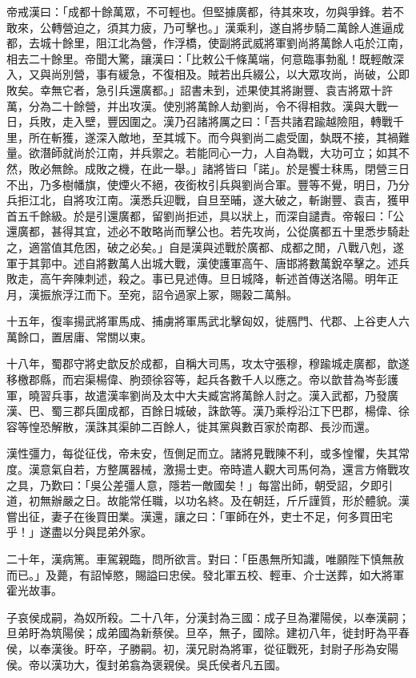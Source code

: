 \begin{pinyinscope}
帝戒漢曰：「成都十餘萬眾，不可輕也。但堅據廣都，待其來攻，勿與爭鋒。若不敢來，公轉營迫之，須其力疲，乃可擊也。」漢乘利，遂自將步騎二萬餘人進逼成都，去城十餘里，阻江北為營，作浮橋，使副將武威將軍劉尚將萬餘人屯於江南，相去二十餘里。帝聞大驚，讓漢曰：「比敕公千條萬端，何意臨事勃亂！既輕敵深入，又與尚別營，事有緩急，不復相及。賊若出兵綴公，以大眾攻尚，尚破，公即敗矣。幸無它者，急引兵還廣都。」詔書未到，述果使其將謝豐、袁吉將眾十許萬，分為二十餘營，并出攻漢。使別將萬餘人劫劉尚，令不得相救。漢與大戰一日，兵敗，走入壁，豐因圍之。漢乃召諸將厲之曰：「吾共諸君踰越險阻，轉戰千里，所在斬獲，遂深入敵地，至其城下。而今與劉尚二處受圍，埶既不接，其禍難量。欲潛師就尚於江南，并兵禦之。若能同心一力，人自為戰，大功可立；如其不然，敗必無餘。成敗之機，在此一舉。」諸將皆曰「諾」。於是饗士秣馬，閉營三日不出，乃多樹幡旗，使煙火不絕，夜銜枚引兵與劉尚合軍。豐等不覺，明日，乃分兵拒江北，自將攻江南。漢悉兵迎戰，自旦至晡，遂大破之，斬謝豐、袁吉，獲甲首五千餘級。於是引還廣都，留劉尚拒述，具以狀上，而深自譴責。帝報曰：「公還廣都，甚得其宜，述必不敢略尚而擊公也。若先攻尚，公從廣都五十里悉步騎赴之，適當值其危困，破之必矣。」自是漢與述戰於廣都、成都之閒，八戰八剋，遂軍于其郭中。述自將數萬人出城大戰，漢使護軍高午、唐邯將數萬銳卒擊之。述兵敗走，高午奔陳刺述，殺之。事已見述傳。旦日城降，斬述首傳送洛陽。明年正月，漢振旅浮江而下。至宛，詔令過家上冢，賜穀二萬斛。

十五年，復率揚武將軍馬成、捕虜將軍馬武北擊匈奴，徙鴈門、代郡、上谷吏人六萬餘口，置居庸、常關以東。

十八年，蜀郡守將史歆反於成都，自稱大司馬，攻太守張穆，穆踰城走廣都，歆遂移檄郡縣，而宕渠楊偉、朐颈徐容等，起兵各數千人以應之。帝以歆昔為岑彭護軍，曉習兵事，故遣漢率劉尚及太中大夫臧宮將萬餘人討之。漢入武都，乃發廣漢、巴、蜀三郡兵圍成都，百餘日城破，誅歆等。漢乃乘桴沿江下巴郡，楊偉、徐容等惶恐解散，漢誅其渠帥二百餘人，徙其黨與數百家於南郡、長沙而還。

漢性彊力，每從征伐，帝未安，恆側足而立。諸將見戰陳不利，或多惶懼，失其常度。漢意氣自若，方整厲器械，激揚士吏。帝時遣人觀大司馬何為，還言方脩戰攻之具，乃歎曰：「吳公差彊人意，隱若一敵國矣！」每當出師，朝受詔，夕即引道，初無辦嚴之日。故能常任職，以功名終。及在朝廷，斤斤謹質，形於體貌。漢嘗出征，妻子在後買田業。漢還，讓之曰：「軍師在外，吏士不足，何多買田宅乎！」遂盡以分與昆弟外家。

二十年，漢病篤。車駕親臨，問所欲言。對曰：「臣愚無所知識，唯願陛下慎無赦而已。」及薨，有詔悼愍，賜謚曰忠侯。發北軍五校、輕車、介士送葬，如大將軍霍光故事。

子哀侯成嗣，為奴所殺。二十八年，分漢封為三國：成子旦為灈陽侯，以奉漢嗣；旦弟盱為筑陽侯；成弟國為新蔡侯。旦卒，無子，國除。建初八年，徙封盱為平春侯，以奉漢後。盱卒，子勝嗣。初，漢兄尉為將軍，從征戰死，封尉子彤為安陽侯。帝以漢功大，復封弟翕為褒親侯。吳氏侯者凡五國。


\end{pinyinscope}
